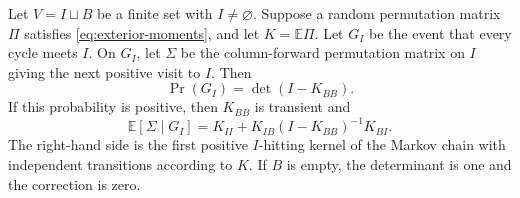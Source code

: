 \begin{proposition}\label{prop:next-pin-kernel}
Let $V=I\sqcup B$ be a finite set with $I\ne\varnothing$.  Suppose
a random permutation matrix $\Pi$ satisfies
\eqref{eq:exterior-moments}, and let $K=\mathbb E\Pi$.  Let $G_I$
be the event that every cycle meets $I$.  On $G_I$, let $\Sigma$
be the column-forward permutation matrix on $I$ giving the next
positive visit to $I$.
Then
\begin{equation}\label{eq:all-hit-determinant}
                         \Pr(G_I)=\det(I-K_{BB}).
\end{equation}
If this probability is positive, then $K_{BB}$ is transient and
\begin{equation}\label{eq:conditional-next-pin}
 \mathbb E[\Sigma\mid G_I]
       =K_{II}+K_{IB}(I-K_{BB})^{-1}K_{BI}.
\end{equation}
The right-hand side is the first positive $I$-hitting kernel of
the Markov chain with independent transitions according to $K$.
If $B$ is empty, the determinant is one and the correction is zero.
\end{proposition}

